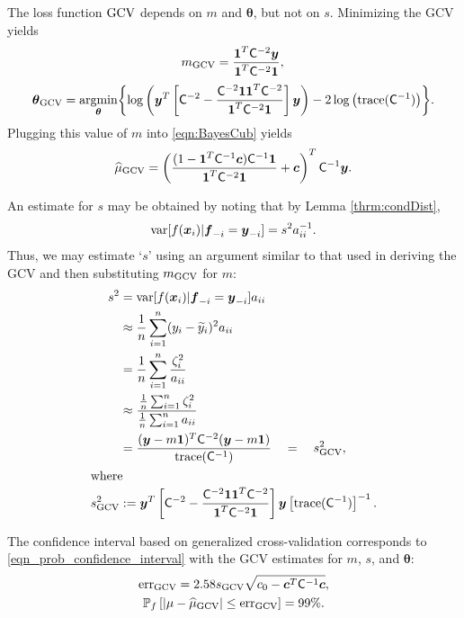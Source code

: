 \documentclass{iitthesis}          %
\newcommand{\bm}[1]{\boldsymbol{#1}}
\newcommand{\trace}[1]{\textup{trace}{#1}}
\newcommand{\vtheta}{{\bm{\theta}}}
\newcommand{\vc}{\bm{c}}
\newcommand{\vf}{\bm{f}}
\newcommand{\vx}{\bm{x}}
\newcommand{\vy}{\bm{y}}
\newcommand{\vone}{\bm{1}}
\newcommand{\mC}{\mathsf{C}}
\newcommand{\var}{{\textup{var}}}
\newcommand{\hmu}{\widehat{\mu}}
\newcommand{\err}{\textup{err}}
\providecommand{\argmin}{\operatorname*{argmin}}
\begin{document}
The loss function $\textup{GCV}$ depends on $m$ and $\vtheta$, but not on $s$.  Minimizing the GCV  yields
\begin{equation*}
m_{\textup{GCV}} = \frac{\vone^T \mC^{-2} \vy}{\vone^T \mC^{-2} \vone},\\ 
\end{equation*}
\begin{multline*}
\vtheta_{\textup{GCV}} = \argmin_\vtheta \biggl\{\log \left(  \vy^T \left[\mC^{-2} - \frac{\mC^{-2} \vone \vone^T \mC^{-2}}{\vone^T \mC^{-2} \vone}  \right] \vy \right)  
- 2 \log \left ( \trace(\mC^{-1}) \right ) \biggr\} .
\end{multline*}
Plugging this value of $m$ into \eqref{eqn:BayesCub} yields
\begin{equation*}
\widehat{\mu}_{\textup{GCV}}
= \left(\frac{(1 - \vone^T  \mC^{-1}\vc) \mC^{-1} \vone}{\vone^T \mC^{-2} \vone} + \vc \right)^T \mC^{-1} \vy.
\end{equation*}

An estimate for $s$ may be obtained by noting that by Lemma \ref{thrm:condDist},
\begin{align*}
\var[f(\vx_i ) | \vf_{-i} = \vy_{-i}] = s^2 a_{ii}^{-1}.
\end{align*}
Thus, we may estimate `$s$' using an argument similar to that used in deriving the GCV and then substituting $m_{\textup{GCV}}$ for $m$:
\begin{align*}
s^2 &= \var[f(\vx_i ) | \vf_{-i} = \vy_{-i}] a_{ii} \\ 
& \approx \frac 1n \sum_{i=1}^n (y_i - \widetilde{y}_i)^2a_{ii} \\
& = \frac 1n \sum_{i=1}^n \frac{\zeta_i^2}{a_{ii}} \\ 
& \approx \frac{ \frac 1n \sum_{i=1}^n \zeta_i^2}{\frac 1n \sum_{i=1}^n a_{ii} } \\
& = \frac{(\vy - m\vone)^T \mC^{-2} (\vy - m \vone)}{ \trace(\mC^{-1}) } \quad = \quad s^2_{\textup{GCV}}, \\
 \intertext{where}
 s^2_{\textup{GCV}} & : = \vy^T \left[\mC^{-2} - \frac{\mC^{-2} \vone \vone^T \mC^{-2}}{\vone^T \mC^{-2} \vone}  \right] \vy  \left[ \trace(\mC^{-1}) \right]^{-1}. 
\end{align*}

The confidence interval based on generalized cross-validation corresponds to \eqref{eqn_prob_confidence_interval} with the GCV estimates for $m$, $s$, and $\vtheta$:
\begin{gather}
\label{GCVerr}
\err_{\textup{GCV}} = 2.58 s_{\textup{GCV}}  \sqrt{c_0 - \vc^T\mC^{-1}\vc}, \\
\label{GCVCI}
\mathbb{P}_f \left[
|\mu-\hmu_{\textup{GCV}}| \leq \err_{\textup{GCV}} 
\right] = 99\%.
\end{gather}
\end{document}

